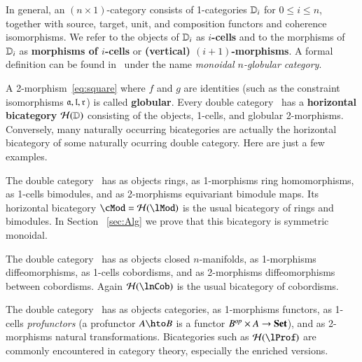 \documentclass{amsart}
\begin{document}
\begin{rmk}\label{rmk:monglob}
  In general, an $(n\times 1)$-category consists of 1-categories
  $\mathbb{D}_i$ for $0\le i\le n$, together with source, target, unit, and
  composition functors and coherence isomorphisms.  We refer to the
  objects of $\mathbb{D}_i$ as \textbf{$i$-cells} and to the morphisms of
  $\mathbb{D}_i$ as \textbf{morphisms of $i$-cells} or \textbf{(vertical)
    $(i+1)$-morphisms}.  A formal definition can be found
  in~\cite{batanin:monglob} under the name \emph{monoidal $n$-globular
    category}.
\end{rmk}


A 2-morphism~\eqref{eq:square} where $f$ and $g$ are identities (such
as the constraint isomorphisms $\mathfrak{a},\mathfrak{l},\mathfrak{r}$) is called
\textbf{globular}.  Every double category \lD\ has a
\textbf{horizontal bicategory} $\mathcal{H}(\mathbb{D})$ consisting of the objects,
1-cells, and globular 2-morphisms.  Conversely, many naturally
occurring bicategories are actually the horizontal bicategory of some
naturally ocurring double category.  Here are just a few examples.

\begin{eg}
  The double category \lMod\ has as objects rings, as 1-morphisms ring
  homomorphisms, as 1-cells bimodules, and as 2-morphisms equivariant
  bimodule maps.  Its horizontal bicategory $\cMod = \cH(\lMod)$ is
  the usual bicategory of rings and bimodules. In Section ~\ref{sec:Alg} we prove that this bicategory is symmetric monoidal.
\end{eg}

\begin{eg}
  The double category \lnCob\ has as objects closed $n$-manifolds, as
  1-morphisms diffeomorphisms, as 1-cells cobordisms, and as
  2-morphisms diffeomorphisms between cobordisms.  Again $\cH(\lnCob)$
  is the usual bicategory of cobordisms.
\end{eg}

\begin{eg}
  The double category \lProf\ has as objects categories, as
  1-morphisms functors, as 1-cells \emph{profunctors} (a profunctor
  $A\hto B$ is a functor $B^{\mathit{op}}\times A\to \mathbf{Set}$), and as
  2-morphisms natural transformations.  Bicategories such as
  $\cH(\lProf)$ are commonly encountered in category theory,
  especially the enriched versions.
\end{eg}
\end{document}

